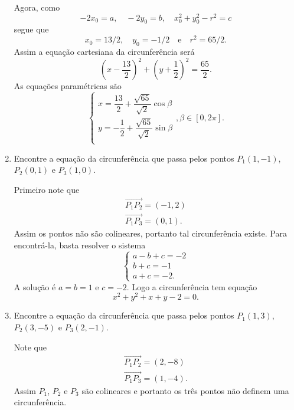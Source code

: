 \begin{exemplos}
\begin{enumerate}
\begin{solucao}
      Agora, como
      \[
        -2x_0 = a,\quad -2y_0 = b,\quad x_0^2 + y_0^2 - r^2 = c
      \]
      segue que
      \[
        x_0 = 13/2,\quad y_0 = -1/2 \quad\mbox{e}\quad r^2 = 65/2.
      \]
      Assim a equa\c{c}\~ao cartesiana da circunfer\^encia ser\'a
    \[
      \left(x - \dfrac{13}{2}\right)^2 + \left(y + \dfrac{1}{2}\right)^2 = \dfrac{65}{2}.
    \]
    As equa\c{c}\~oes param\'etricas s\~ao
    \[
      \begin{cases}
        x = \dfrac{13}{2} + \dfrac{\sqrt{65}}{\sqrt{2}}\cos\beta\\
        y = -\dfrac{1}{2} + \dfrac{\sqrt{65}}{\sqrt{2}}\sin\beta\\
      \end{cases}, \beta \in [0,2\pi].
    \]
    \end{solucao}
    \item Encontre a equa\c{c}\~ao da circunfer\^encia que passa pelos pontos $P_1(1,-1)$, $P_2(0,1)$ e $P_3(1,0)$.
    \begin{solucao}
      Primeiro note que
      \begin{align*}
        \vec{P_1P_2} = (-1,2)\\
        \vec{P_1P_3} = (0,1).
      \end{align*}
      Assim os pontos n\~ao s\~ao colineares, portanto tal circunfer\^encia existe. Para encontr\'a-la, basta resolver o sistema
      \[
        \begin{cases}
          a - b + c = -2\\
          b + c = -1\\
          a + c = -2.
        \end{cases}
      \]
      A solu\c{c}\~ao \'e $a = b = 1$ e $c = -2$. Logo a circunfer\^encia tem equa\c{c}\~ao
      \[
        x^2 + y^2 + x + y - 2 = 0.
      \]
    \end{solucao}
    \item Encontre a equa\c{c}\~ao da circunfer\^encia que passa pelos pontos $P_1(1,3)$, $P_2(3,-5)$ e $P_3(2,-1)$.
    \begin{solucao}
      Note que
      \begin{align*}
        \vec{P_1P_2} = (2, -8)\\
        \vec{P_1P_3} = (1, -4).
      \end{align*}
      Assim $P_1$, $P_2$ e $P_3$ s\~ao colineares e portanto os tr\^es pontos n\~ao definem uma circunfer\^encia.
    \end{solucao}
  \end{enumerate}
\end{exemplos}

